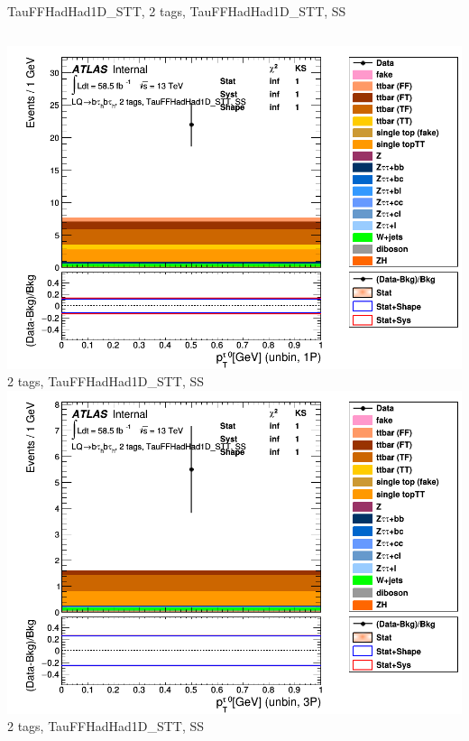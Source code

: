 \begin{frame}{TauFFHadHad1D\_STT, 2 tags, TauFFHadHad1D\_STT, SS}
\begin{columns}[c]
    \centering\includegraphics[width=\textwidth]{C_2tag2pjet_0ptv_SS_UnbinLeadTau1P}\\
    2 tags, TauFFHadHad1D\_STT, SS
    \centering\includegraphics[width=\textwidth]{C_2tag2pjet_0ptv_SS_UnbinLeadTau3P}\\
    2 tags, TauFFHadHad1D\_STT, SS
  \end{columns}
\end{frame}

